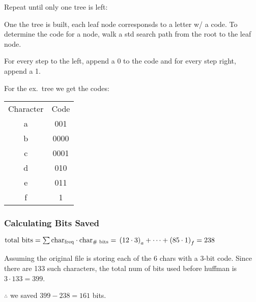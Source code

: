 Repeat until only one tree is left:


One the tree is built, each leaf node corresponsds to a letter w/ a code.
To determine the code for a node, walk a std search path from the root to the leaf node.

For every step to the left, append a 0 to the code and for every step right, append a 1.

For the ex.\ tree we get the codes:

\begin{tabular}{cc}
    Character & Code \\
    a & 001\\
    b & 0000\\
    c & 0001\\
    d & 010\\
    e & 011\\
    f & 1
\end{tabular}
\subsubsection*{Calculating Bits Saved}
$\text{total bits}=\sum \text{char}_{\text{freq}}\cdot \text{char}_{\text{\# bits}}=\\%
\left(12\cdot 3\right)_{a}+\cdots+\left(85\cdot 1\right)_{f}=238$

Assuming the original file is storing each of the 6 chars with a 3-bit code.
Since there are 133 such characters, the total num of bits used before huffman is $3\cdot 133=399$.

$\therefore$ we saved $399 - 238 = 161$ bits.
